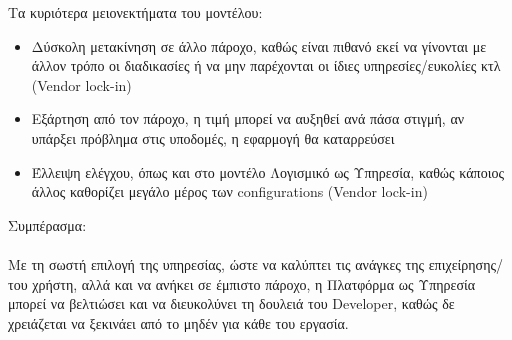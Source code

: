 \documentclass{article}
\begin{document}
Τα κυριότερα μειονεκτήματα του μοντέλου:
\begin{itemize}
\item Δύσκολη μετακίνηση σε άλλο πάροχο, καθώς είναι πιθανό εκεί να γίνονται με άλλον τρόπο οι διαδικασίες ή να μην παρέχονται οι ίδιες υπηρεσίες/ευκολίες κτλ (Vendor lock-in)
\item Εξάρτηση από τον πάροχο, η τιμή μπορεί να αυξηθεί ανά πάσα στιγμή, αν υπάρξει πρόβλημα στις υποδομές, η εφαρμογή θα καταρρεύσει
\item Έλλειψη ελέγχου, όπως και στο μοντέλο Λογισμικό ως Υπηρεσία, καθώς κάποιος άλλος καθορίζει μεγάλο μέρος των configurations (Vendor lock-in)
\end{itemize}
Συμπέρασμα: \\ \\
Με τη σωστή επιλογή της υπηρεσίας, ώστε να καλύπτει τις ανάγκες της επιχείρησης/του χρήστη, αλλά και να ανήκει σε έμπιστο πάροχο, η Πλατφόρμα ως Υπηρεσία μπορεί να βελτιώσει και να διευκολύνει τη δουλειά του Developer, καθώς δε χρειάζεται να ξεκινάει από το μηδέν για κάθε του εργασία.
\end{document}
